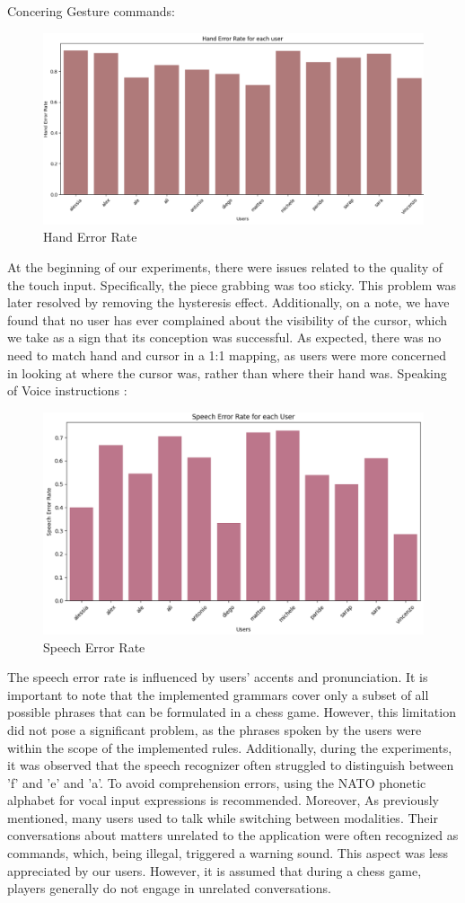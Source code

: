 \documentclass[a4paper, 11pt, twocolumn]{IEEEtran}
\begin{document}
    Concering Gesture commands:
    \begin{figure}
        \centering
        \includegraphics[width=.5\textwidth]{images/hand_error_rate.png}
        \caption{Hand Error Rate }
        \label{fig:hand_error_rate}
    \end{figure}
    At the beginning of our experiments, there were issues related to the quality of the touch input. Specifically, the piece grabbing was too sticky. This problem was later resolved by removing the hysteresis effect.
    Additionally, on a note, we have found that no user has ever complained about the visibility of the cursor, which we take as a sign that its conception was successful. 
    As expected, there was no need to match hand and cursor in a 1:1 mapping, as users were more concerned in looking at where the cursor was, rather than where their hand was.
    Speaking of Voice instructions : 
    \begin{figure}
        \centering
        \includegraphics[width=.5\textwidth]{images/speech_error_rate.png}
        \caption{Speech Error Rate }
        \label{fig:speech_error_rate}
    \end{figure}
    The speech error rate is influenced by users' accents and pronunciation. It is important to note that the implemented grammars cover only a subset of all possible phrases that can be formulated in a chess game. However, this limitation did not pose a significant problem, as the phrases spoken by the users were within the scope of the implemented rules. Additionally, during the experiments, it was observed that the speech recognizer often struggled to distinguish between 'f' and 'e' and 'a'. To avoid comprehension errors, using the NATO phonetic alphabet for vocal input expressions is recommended. Moreover, As previously mentioned, many users used to talk while switching between modalities. Their conversations about matters unrelated to the application were often recognized as commands, which, being illegal, triggered a warning sound. This aspect was less appreciated by our users. However, it is assumed that during a chess game, players generally do not engage in unrelated conversations.
    
\end{document}
